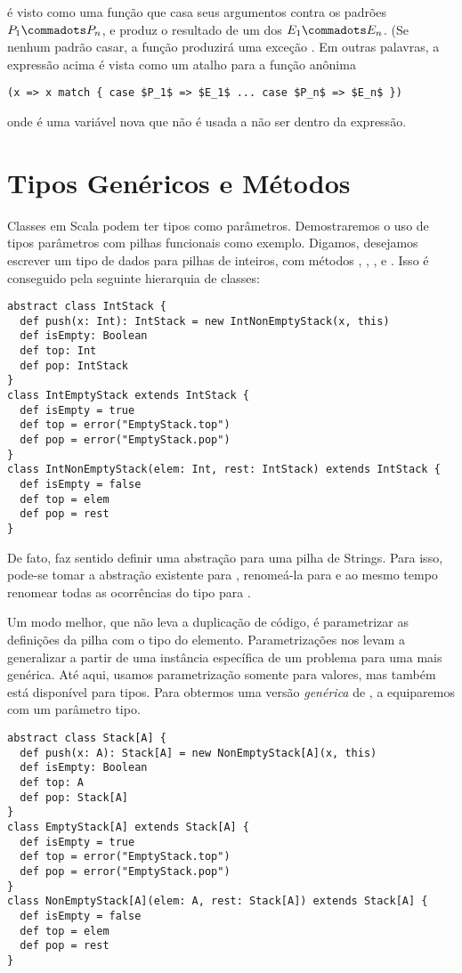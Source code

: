 é visto como uma função que casa seus argumentos contra os padrões $P_1 \commadots P_n$,
e produz o resultado de um dos $E_1 \commadots E_n$. (Se nenhum padrão casar, a função 
produzirá uma  exceção . 
Em outras palavras, a expressão acima é vista como um atalho para a função anônima
\begin{lstlisting}
(x => x match { case $P_1$ => $E_1$ ... case $P_n$ => $E_n$ })
\end{lstlisting}
onde  é uma variável nova que não é usada a não ser dentro da expressão.

\chapter{Tipos Genéricos e Métodos}

Classes em Scala podem ter tipos como parâmetros. Demostraremos o uso 
de tipos parâmetros com pilhas funcionais como exemplo. Digamos, desejamos
escrever um tipo de dados para pilhas de inteiros, com métodos ,
, , e . Isso é conseguido pela seguinte 
hierarquia de classes:

\begin{lstlisting}
abstract class IntStack {
  def push(x: Int): IntStack = new IntNonEmptyStack(x, this)
  def isEmpty: Boolean
  def top: Int
  def pop: IntStack
}
class IntEmptyStack extends IntStack {
  def isEmpty = true
  def top = error("EmptyStack.top")
  def pop = error("EmptyStack.pop")
}
class IntNonEmptyStack(elem: Int, rest: IntStack) extends IntStack {
  def isEmpty = false
  def top = elem
  def pop = rest
}
\end{lstlisting}

De fato, faz sentido definir uma abstração para uma pilha de Strings. Para
isso, pode-se tomar a abstração existente para , renomeá-la para 
 e ao mesmo tempo renomear todas as ocorrências do tipo
 para .

Um modo melhor, que não leva a duplicação de código, é parametrizar as
definições da pilha com o tipo do elemento. Parametrizações nos levam
a generalizar a partir de uma instância específica de um problema para 
uma mais genérica. Até aqui, usamos parametrização somente para valores, mas 
também está disponível para tipos. Para obtermos uma versão {\em genérica} de
, a equiparemos com um parâmetro tipo.

\begin{lstlisting}
abstract class Stack[A] {
  def push(x: A): Stack[A] = new NonEmptyStack[A](x, this)
  def isEmpty: Boolean
  def top: A
  def pop: Stack[A]
}
class EmptyStack[A] extends Stack[A] {
  def isEmpty = true
  def top = error("EmptyStack.top")
  def pop = error("EmptyStack.pop")
}
class NonEmptyStack[A](elem: A, rest: Stack[A]) extends Stack[A] {
  def isEmpty = false
  def top = elem
  def pop = rest
}
\end{lstlisting}

